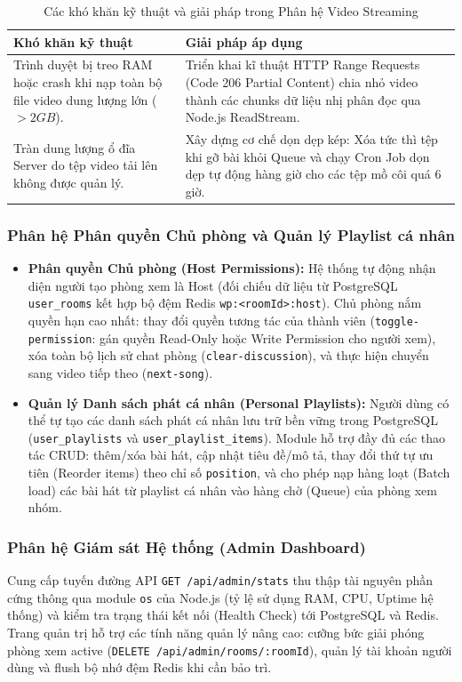 \documentclass[12pt,a4paper]{extarticle}
\begin{document}
\begin{table}[H]
\centering
\small
\caption{Các khó khăn kỹ thuật và giải pháp trong Phân hệ Video Streaming}
\label{tab:stream_problems}
\renewcommand{\arraystretch}{1.35}
\begin{tabular}{|p{5.5cm}|p{8.5cm}|}
\hline
\textbf{Khó khăn kỹ thuật} & \textbf{Giải pháp áp dụng} \\ \hline
Trình duyệt bị treo RAM hoặc crash khi nạp toàn bộ file video dung lượng lớn ($>2GB$). & Triển khai kĩ thuật HTTP Range Requests (Code 206 Partial Content) chia nhỏ video thành các chunks dữ liệu nhị phân đọc qua Node.js ReadStream. \\ \hline
Tràn dung lượng ổ đĩa Server do tệp video tải lên không được quản lý. & Xây dựng cơ chế dọn dẹp kép: Xóa tức thì tệp khi gỡ bài khỏi Queue và chạy Cron Job dọn dẹp tự động hàng giờ cho các tệp mồ côi quá 6 giờ. \\ \hline
\end{tabular}
\end{table}


\subsubsection{Phân hệ Phân quyền Chủ phòng và Quản lý Playlist cá nhân}
\begin{itemize}[leftmargin=1.2cm]
    \item \textbf{Phân quyền Chủ phòng (Host Permissions):} Hệ thống tự động nhận diện người tạo phòng xem là Host (đối chiếu dữ liệu từ PostgreSQL \texttt{user\_rooms} kết hợp bộ đệm Redis \texttt{wp:<roomId>:host}). Chủ phòng nắm quyền hạn cao nhất: thay đổi quyền tương tác của thành viên (\texttt{toggle-permission}: gán quyền Read-Only hoặc Write Permission cho người xem), xóa toàn bộ lịch sử chat phòng (\texttt{clear-discussion}), và thực hiện chuyển sang video tiếp theo (\texttt{next-song}).
    \item \textbf{Quản lý Danh sách phát cá nhân (Personal Playlists):} Người dùng có thể tự tạo các danh sách phát cá nhân lưu trữ bền vững trong PostgreSQL (\texttt{user\_playlists} và \texttt{user\_playlist\_items}). Module hỗ trợ đầy đủ các thao tác CRUD: thêm/xóa bài hát, cập nhật tiêu đề/mô tả, thay đổi thứ tự ưu tiên (Reorder items) theo chỉ số \texttt{position}, và cho phép nạp hàng loạt (Batch load) các bài hát từ playlist cá nhân vào hàng chờ (Queue) của phòng xem nhóm.
\end{itemize}


\subsubsection{Phân hệ Giám sát Hệ thống (Admin Dashboard)}
Cung cấp tuyến đường API \texttt{GET /api/admin/stats} thu thập tài nguyên phần cứng thông qua module \texttt{os} của Node.js (tỷ lệ sử dụng RAM, CPU, Uptime hệ thống) và kiểm tra trạng thái kết nối (Health Check) tới PostgreSQL và Redis. Trang quản trị hỗ trợ các tính năng quản lý nâng cao: cưỡng bức giải phóng phòng xem active (\texttt{DELETE /api/admin/rooms/:roomId}), quản lý tài khoản người dùng và flush bộ nhớ đệm Redis khi cần bảo trì.
\end{document}
